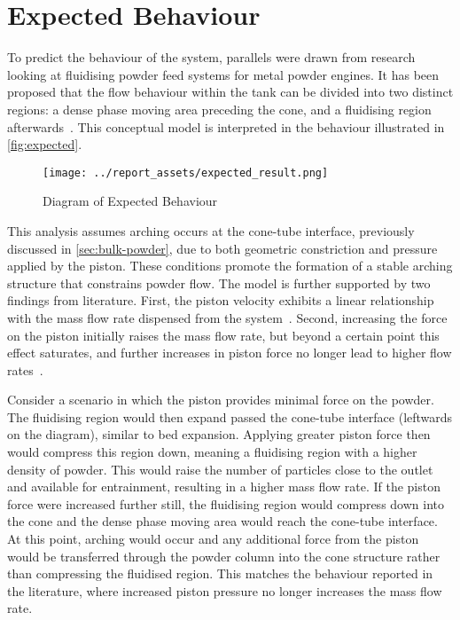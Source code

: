 \section{Expected Behaviour}\label{sec:expected-behaviour}
To predict the behaviour of the system, parallels were drawn from research looking at fluidising powder feed systems for metal powder engines. It has been proposed that the flow behaviour within the tank can be divided into two distinct regions: a dense phase moving area preceding the cone, and a fluidising region afterwards~\cite{Tang22}. This conceptual model is interpreted in the behaviour illustrated in \autoref{fig:expected}. 
\begin{figure}[htbp]
    \centering
    
    \begin{minipage}{0.6\textwidth}
        \centering
        \texttt{[image: ../report\_assets/expected\_result.png]}
        \caption{Diagram of Expected Behaviour}\label{fig:expected}
    \end{minipage}
    
\end{figure}
This analysis assumes arching occurs at the cone-tube interface, previously discussed in \autoref{sec:bulk-powder}, due to both geometric constriction and pressure applied by the piston. These conditions promote the formation of a stable arching structure that constrains powder flow. The model is further supported by two findings from literature. First, the piston velocity exhibits a linear relationship with the mass flow rate dispensed from the system~\cite{SUN201630}. Second, increasing the force on the piston initially raises the mass flow rate, but beyond a certain point this effect saturates, and further increases in piston force no longer lead to higher flow rates~\cite{LI2021712}.

Consider a scenario in which the piston provides minimal force on the powder. The fluidising region would then expand passed the cone-tube interface (leftwards on the diagram), similar to bed expansion. Applying greater piston force then would compress this region down, meaning a fluidising region with a higher density of powder. This would raise the number of particles close to the outlet and available for entrainment, resulting in a higher mass flow rate. If the piston force were increased further still, the fluidising region would compress down into the cone and the dense phase moving area would reach the cone-tube interface. At this point, arching would occur and any additional force from the piston would be transferred through the powder column into the cone structure rather than compressing the fluidised region. This matches the behaviour reported in the literature, where increased piston pressure no longer increases the mass flow rate. 

